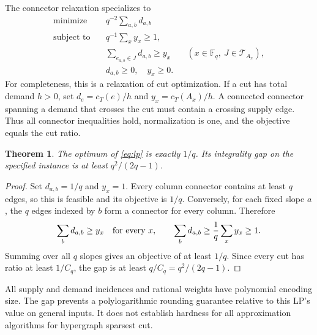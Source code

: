 \documentclass[11pt]{article}
\newtheorem{theorem}{Theorem}
\newcommand{\F}{\mathbb F}
\begin{document}
The connector relaxation \cite[Equation (24)]{JS} specializes to
\begin{equation}\label{eq:lp}
\begin{aligned}
 \text{minimize}\quad &q^{-2}\sum_{a,b}d_{a,b}\\
 \text{subject to}\quad &q^{-1}\sum_x y_x\ge1,\\
 &\sum_{e_{a,b}\in J}d_{a,b}\ge y_x
       &&(x\in\F_q,\ J\in\mathcal T_{A_x}),\\
 &d_{a,b}\ge0,\quad y_x\ge0.
\end{aligned}
\end{equation}
For completeness, this is a relaxation of cut optimization. If a cut has
total demand $h>0$, set $d_e=c_T(e)/h$ and $y_x=c_T(A_x)/h$.
A connected connector spanning a demand that crosses the cut must contain
a crossing supply edge. Thus all connector inequalities hold, normalization
is one, and the objective equals the cut ratio.

\begin{theorem}
The optimum of \eqref{eq:lp} is exactly $1/q$. Its integrality gap on the
specified instance is at least $q^2/(2q-1)$.
\end{theorem}
\begin{proof}
Set $d_{a,b}=1/q$ and $y_x=1$. Every column connector contains at least
$q$ edges, so this is feasible and its objective is $1/q$.
Conversely, for each fixed slope $a$, the $q$ edges indexed by $b$ form
a connector for every column. Therefore
\[
 \sum_b d_{a,b}\ge y_x\quad\hbox{for every }x,
 \qquad \sum_b d_{a,b}\ge\frac1q\sum_x y_x\ge1.
\]
Summing over all $q$ slopes gives an objective of at least $1/q$.
Since every cut has ratio at least $1/C_q$, the gap is at least
$q/C_q=q^2/(2q-1)$.
\end{proof}

All supply and demand incidences and rational weights have polynomial
encoding size. The gap prevents a polylogarithmic rounding guarantee
relative to this LP's value on general inputs. It does not establish
hardness for all approximation algorithms for hypergraph sparsest cut.
\end{document}
